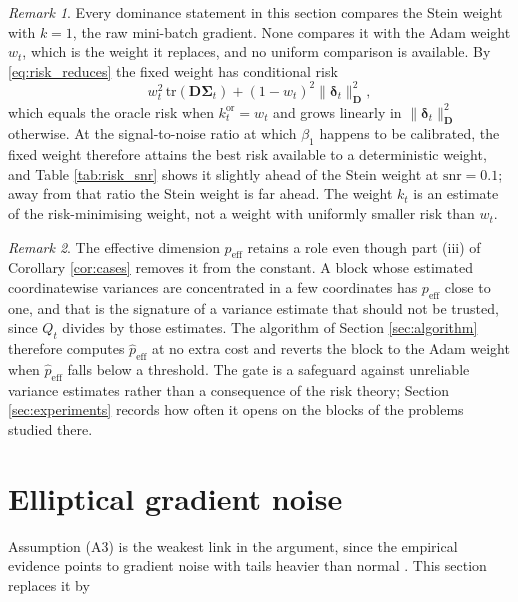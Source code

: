 \documentclass[a4paper,fleqn]{cas-sc}
\theoremstyle{plain}
\theoremstyle{definition}
\theoremstyle{remark}
\newtheorem{remark}{Remark}
\newenvironment{revblock}{}{}
\newcommand{\peff}{p_{\mathrm{eff}}}
\newcommand{\tr}{\mathrm{tr}}
\begin{document}
\begin{remark}
\label{rem:benchmark}
Every dominance statement in this section compares the Stein weight with $k=1$, the raw mini-batch gradient. None compares it with the Adam weight $w_t$, which is the weight it replaces, and no uniform comparison is available. By \eqref{eq:risk_reduces} the fixed weight has conditional risk
\begin{equation}
\label{eq:fixed_risk}
w_t^{2}\,\tr(\bm D\bm\Sigma_t)+(1-w_t)^{2}\|\bm\delta_t\|^2_{\bm D},
\end{equation}
which equals the oracle risk when $k^{\mathrm{or}}_t=w_t$ and grows linearly in $\|\bm\delta_t\|^2_{\bm D}$ otherwise. At the signal-to-noise ratio at which $\beta_1$ happens to be calibrated, the fixed weight therefore attains the best risk available to a deterministic weight, and Table \ref{tab:risk_snr} shows it slightly ahead of the Stein weight at $\mathrm{snr}=0.1$; away from that ratio the Stein weight is far ahead. The weight $k_t$ is an estimate of the risk-minimising weight, not a weight with uniformly smaller risk than $w_t$.
\end{remark}

\begin{remark}
\label{rem:gate}
The effective dimension $\peff$ retains a role even though part (iii) of Corollary \ref{cor:cases} removes it from the constant. A block whose estimated coordinatewise variances are concentrated in a few coordinates has $\peff$ close to one, and that is the signature of a variance estimate that should not be trusted, since $Q_t$ divides by those estimates. The algorithm of Section \ref{sec:algorithm} therefore computes $\hat\peff$ at no extra cost and reverts the block to the Adam weight when $\hat\peff$ falls below a threshold. The gate is a safeguard against unreliable variance estimates rather than a consequence of the risk theory; Section \ref{sec:experiments} records how often it opens on the blocks of the problems studied there.
\end{remark}

\section{Elliptical gradient noise}
\label{sec:elliptical}

Assumption (A3) is the weakest link in the argument, since the empirical evidence points to gradient noise with tails heavier than normal \citep{simsekli2019, panigrahi2019, gurbuzbalaban2021}. This section replaces it by
\end{document}
